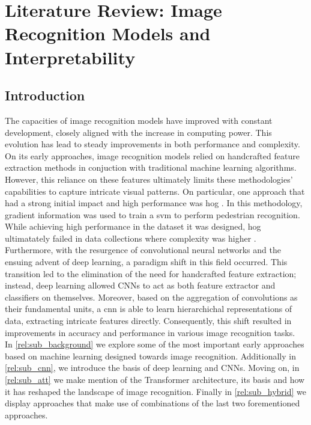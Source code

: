\chapter{Literature Review: Image Recognition Models and Interpretability}
\label{ch:rel}
\chaptertoc{}
\section{Introduction}
The capacities of image recognition models have improved with constant development, 
closely aligned with the increase in computing power. This evolution has lead to steady 
improvements in both performance and complexity. On its early approaches, image recognition models 
relied on handcrafted feature extraction methods  in conjuction with traditional machine learning 
algorithms. However, this reliance on these features ultimately limits these methodologies' 
capabilities to capture intricate visual patterns.
On particular, one approach that had a strong initial impact and high performance was \gls{hog} 
\autocite{dalal2005histograms}. In this methodology, gradient information was used to train a 
\gls{svm} to perform pedestrian recognition. While achieving high performance in the dataset it was 
designed, \gls{hog} ultimatately failed in data collections where complexity was higher 
\autocite{5975165}.\\
Furthermore, with the resurgence of convolutional neural networks and the ensuing advent of 
deep learning, a paradigm shift in this field occurred. This transition led to the elimination of 
the need for handcrafted feature extraction; instead, deep learning allowed CNNs to act 
as both feature extractor and classifiers on themselves. Moreover, based on the aggregation of 
convolutions as their fundamental units, a \gls{cnn} is able to learn hierarchichal 
representations of data, extracting intricate features directly. 
Consequently, this shift resulted in improvements in accuracy and performance in various image 
recognition tasks. \\

\noindent In \autoref{rel:sub_background} we explore some of the most important early approaches based 
on machine learning designed towards image recognition. Additionally in \autoref{rel:sub_cnn}, we 
introduce the basis of deep learning and CNNs. Moving on, in \autoref{rel:sub_att} we make mention 
of the Transformer architecture, its basis and how it has reshaped the landscape of image 
recognition. Finally in \autoref{rel:sub_hybrid} we display approaches that make use of combinations 
of the last two forementioned approaches.\\


